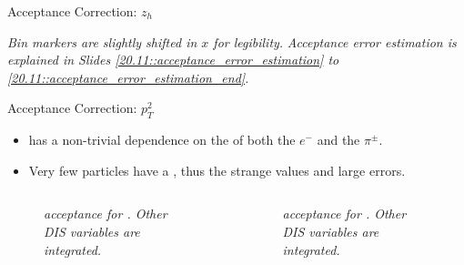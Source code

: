 \begin{frame}{Acceptance Correction: $z_h$}
    \begin{flushright}
        \tiny{\textit{Bin markers are slightly shifted in $x$ for legibility.}}
        \tiny{\textit{Acceptance error estimation is explained in Slides \textcolor{efd_purple}{\ref{20.11::acceptance_error_estimation}} to \textcolor{efd_purple}{\ref{20.11::acceptance_error_estimation_end}}.}}
    \end{flushright}
\end{frame}

\begin{frame}{Acceptance Correction: $p_T^2$}
    \label{11.55::pt2}

    \begin{itemize}
        \item
             has a non-trivial dependence on the \ef{$\theta$} of both the $e^-$ and the $\pi^\pm$.

        \vspace{6pt}
        \item
            Very few particles have a , thus the strange values and large errors.
    \end{itemize}

    \vspace{-12pt}
    \begin{columns}
        \begin{column}{.49\linewidth}
            \begin{center}
                \begin{figure}[t]
                    \scriptsize{\textit{
                         acceptance for \ef{$\pi^-$}.
                        Other DIS variables are integrated.
                    }}
                \end{figure}
            \end{center}
        \end{column}

        \begin{column}{.49\linewidth}
            \begin{center}
                \begin{figure}[t]
                    \scriptsize{\textit{
                         acceptance for \ef{$\pi^+$}.
                        Other DIS variables are integrated.
                    }}
                \end{figure}
            \end{center}
        \end{column}
    \end{columns}


\end{frame}
